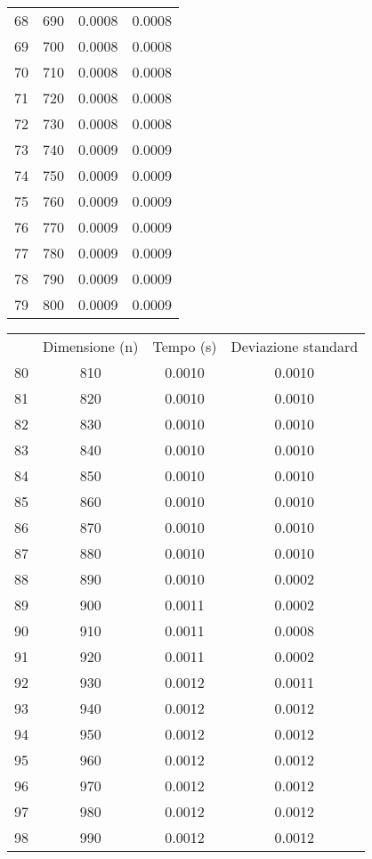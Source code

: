 \begin{table}
\begin{adjustbox}{width=1\textwidth/2}
\begin{tabular}{|c|c|c|c|}
68 & 690 & 0.0008 & 0.0008 \\
\cline{1-4}
69 & 700 & 0.0008 & 0.0008 \\
\cline{1-4}
70 & 710 & 0.0008 & 0.0008 \\
\cline{1-4}
71 & 720 & 0.0008 & 0.0008 \\
\cline{1-4}
72 & 730 & 0.0008 & 0.0008 \\
\cline{1-4}
73 & 740 & 0.0009 & 0.0009 \\
\cline{1-4}
74 & 750 & 0.0009 & 0.0009 \\
\cline{1-4}
75 & 760 & 0.0009 & 0.0009 \\
\cline{1-4}
76 & 770 & 0.0009 & 0.0009 \\
\cline{1-4}
77 & 780 & 0.0009 & 0.0009 \\
\cline{1-4}
78 & 790 & 0.0009 & 0.0009 \\
\cline{1-4}
79 & 800 & 0.0009 & 0.0009 \\
\cline{1-4}
\end{tabular}
\end{adjustbox}
\end{table}

\begin{table}
\centering
\begin{adjustbox}{width=1\textwidth/2}
\begin{tabular}{|c|c|c|c|}
\hline
 & Dimensione (n) & Tempo (s) & Deviazione standard \\
80 & 810 & 0.0010 & 0.0010 \\
\cline{1-4}
81 & 820 & 0.0010 & 0.0010 \\
\cline{1-4}
82 & 830 & 0.0010 & 0.0010 \\
\cline{1-4}
83 & 840 & 0.0010 & 0.0010 \\
\cline{1-4}
84 & 850 & 0.0010 & 0.0010 \\
\cline{1-4}
85 & 860 & 0.0010 & 0.0010 \\
\cline{1-4}
86 & 870 & 0.0010 & 0.0010 \\
\cline{1-4}
87 & 880 & 0.0010 & 0.0010 \\
\cline{1-4}
88 & 890 & 0.0010 & 0.0002 \\
\cline{1-4}
89 & 900 & 0.0011 & 0.0002 \\
\cline{1-4}
90 & 910 & 0.0011 & 0.0008 \\
\cline{1-4}
91 & 920 & 0.0011 & 0.0002 \\
\cline{1-4}
92 & 930 & 0.0012 & 0.0011 \\
\cline{1-4}
93 & 940 & 0.0012 & 0.0012 \\
\cline{1-4}
94 & 950 & 0.0012 & 0.0012 \\
\cline{1-4}
95 & 960 & 0.0012 & 0.0012 \\
\cline{1-4}
96 & 970 & 0.0012 & 0.0012 \\
\cline{1-4}
97 & 980 & 0.0012 & 0.0012 \\
\cline{1-4}
98 & 990 & 0.0012 & 0.0012 \\
\cline{1-4}
\end{tabular}
\end{adjustbox}
\end{table}
